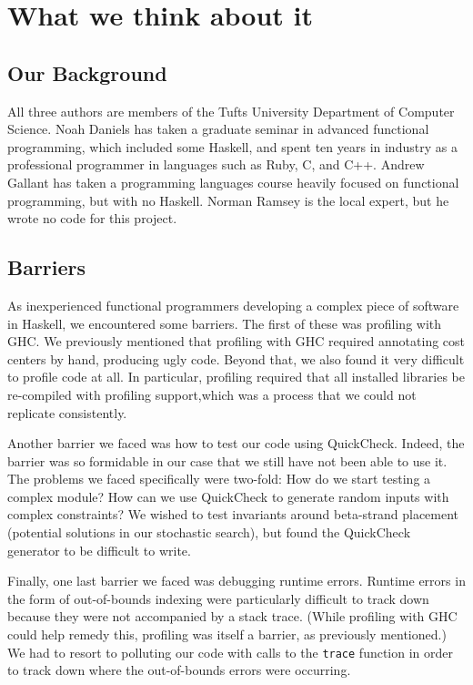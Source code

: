 \documentclass[preprint,nonatbib,blockstyle,nocopyrightspace,times]{sigplanconf}
\begin{document}
\section{What we think about it}

\subsection{Our Background}

All three authors are members of the Tufts University Department of Computer
Science.
Noah Daniels has taken a graduate seminar in advanced functional
programming, which included some Haskell, and spent ten years in industry as a
professional programmer in languages such as Ruby, C, and C++.
Andrew Gallant has taken a programming languages course heavily focused on 
functional programming, but with no Haskell.
Norman Ramsey is the local expert, but he wrote no code for this project.

\subsection{Barriers}

As inexperienced functional programmers developing a complex piece of
software in Haskell, we encountered some barriers.
The first of these was profiling with GHC.
We previously mentioned that profiling with GHC required annotating
cost centers by hand, producing ugly code.
Beyond that, we also found it very difficult to profile code at all.
In particular, profiling required that all installed libraries be re-compiled
with profiling support,which was a process that we could not replicate
consistently.

Another barrier we faced was how to test our code using QuickCheck.
Indeed, the barrier was so formidable in our case that we still have not been 
able to use it.
The problems we faced specifically were two-fold: How do we start testing
a complex module? How can we use QuickCheck to generate random inputs with 
complex constraints? 
We wished to test invariants around beta-strand placement 
(potential solutions in our stochastic search), but found the QuickCheck generator
to be difficult to write.

Finally, one last barrier we faced was debugging runtime errors.
Runtime errors in the form of out-of-bounds indexing were particularly 
difficult to track down because they were not accompanied by a stack trace.
(While profiling with GHC could help remedy this, profiling was itself a 
barrier, as previously mentioned.)
We had to resort to polluting our code with calls to the \texttt{trace} function 
in order to track down where the out-of-bounds errors were occurring.
\end{document}
